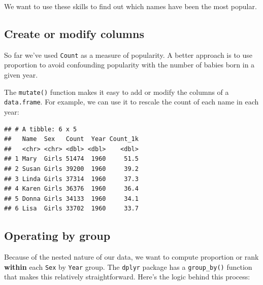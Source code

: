 \documentclass[
]{book}
\newenvironment{Shaded}{\begin{snugshade}}{\end{snugshade}}
\newcommand{\DataTypeTok}[1]{\textcolor[rgb]{0.13,0.29,0.53}{#1}}
\newcommand{\DecValTok}[1]{\textcolor[rgb]{0.00,0.00,0.81}{#1}}
\newcommand{\KeywordTok}[1]{\textcolor[rgb]{0.13,0.29,0.53}{\textbf{#1}}}
\newcommand{\NormalTok}[1]{#1}
\newcommand{\OperatorTok}[1]{\textcolor[rgb]{0.81,0.36,0.00}{\textbf{#1}}}
\newcommand{\StringTok}[1]{\textcolor[rgb]{0.31,0.60,0.02}{#1}}
\begin{document}
We want to use these skills to find out which names have been the most popular.

\hypertarget{create-or-modify-columns}{%
\subsection{Create or modify columns}\label{create-or-modify-columns}}

So far we've used \texttt{Count} as a measure of popularity. A better
approach is to use proportion to avoid confounding
popularity with the number of babies born in a given year.

The \texttt{mutate()} function makes it easy to add or modify the columns
of a \texttt{data.frame}. For example, we can use it to rescale the count
of each name in each year:

\begin{Shaded}
\end{Shaded}

\begin{verbatim}
## # A tibble: 6 x 5
##   Name  Sex   Count  Year Count_1k
##   <chr> <chr> <dbl> <dbl>    <dbl>
## 1 Mary  Girls 51474  1960     51.5
## 2 Susan Girls 39200  1960     39.2
## 3 Linda Girls 37314  1960     37.3
## 4 Karen Girls 36376  1960     36.4
## 5 Donna Girls 34133  1960     34.1
## 6 Lisa  Girls 33702  1960     33.7
\end{verbatim}

\hypertarget{operating-by-group}{%
\subsection{Operating by group}\label{operating-by-group}}

Because of the nested nature of our data, we want to compute proportion
or rank \textbf{within} each \texttt{Sex} by \texttt{Year} group. The \texttt{dplyr}
package has a \texttt{group\_by()} function that makes this relatively
straightforward. Here's the logic behind this process:
\end{document}
